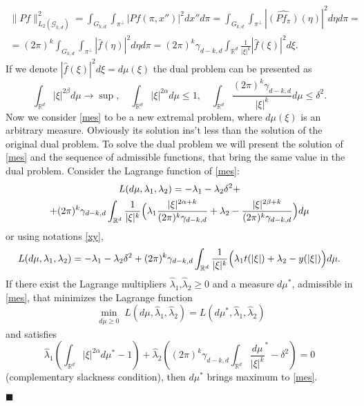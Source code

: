 \documentclass[12pt]{iopart}
\newenvironment{proof}
{\par\noindent{\bf Proof}}
{\hfill$\scriptstyle\blacksquare$}
\begin{document}
\begin{proof}
\[\]
\begin{multline*}
  \|Pf\|^2_{L_2(\mathcal G_{k,d})}=\int_{G_{k,d}}\int_{\pi^\perp}|Pf(\pi,x'')|^2  dx''d\pi =
  \int_{G_{k,d}}\int_{\pi^\perp}|\widehat{(Pf_\pi)}(\eta)|^2  d\eta d\pi = \\
  =(2\pi)^{k}\int_{G_{k,d}}\int_{\pi^\perp}|\widehat
  f(\eta )|^2d\eta d\pi =
  (2\pi)^{k}\gamma_{d-k,d}\int_{\mathbb R^d}\frac{1}{|\xi|^k}|\widehat f(\xi )|^2d\xi.
\end{multline*}
If we denote $|\widehat f(\xi)|^2 d\xi =d\mu(\xi)$ the dual problem can be presented as
  \begin{equation}
  \label{mes}
  \int_{\mathbb R^d}|\xi|^{2\beta}d\mu\to \sup,\quad
  \int_{\mathbb R^d}|\xi|^{2\alpha}d\mu\leqslant  1,\quad\int_{\mathbb R^d}\frac{(2\pi)^{k}\gamma_{d-k,d}}{|\xi|^k}d\mu\leqslant \delta^2.
  \end{equation}
Now we consider \eqref{mes} to be a new extremal problem, where $d\mu(\xi)$ is an arbitrary measure. Obviously its solution ins't less than the solution of the original dual problem. To solve the dual problem we will present the solution of \eqref{mes} and the sequence of admissible functions, that bring the same value in the dual problem.
Consider the Lagrange function of \eqref{mes}:
 \begin{multline*}
L(d\mu ,\lambda_1,\lambda_2)=-\lambda_1-\lambda_2\delta^2+\\
  +(2\pi)^{k}\gamma_{d-k,d}\int_{\mathbb R^d}\frac{1}{|\xi|^k}\Bigl(\lambda_1\frac{|\xi|^{2\alpha+k}}{(2\pi)^{k}\gamma_{d-k,d}}+\lambda_2-\frac{|\xi|^{2\beta+k}}{(2\pi)^{k}\gamma_{d-k,d}}\Bigr)d\mu
\end{multline*}
or using notations \eqref{xy},
 $$
L(d\mu ,\lambda_1,\lambda_2)=-\lambda_1-\lambda_2\delta^2+(2\pi)^{k}\gamma_{d-k,d}\int_{\mathbb R^d}\frac{1}{|\xi|^k}\Bigl(\lambda_1t(|\xi|)+\lambda_2-y(|\xi|)\Bigr)d\mu.
$$
If there exist the Lagrange multipliers $\widehat\lambda_1$,$\widehat\lambda_2\geqslant 0$ and a measure $d\mu^*$, admissible in \eqref{mes}, that minimizes the Lagrange function
	$$\min_{
    \begin{smallmatrix}
    d\mu\geqslant 0
    \end{smallmatrix}} L(d\mu,\widehat{\lambda}_1,\widehat{\lambda}_2)=L(d\mu^*,\widehat{\lambda}_1,\widehat{\lambda}_2)$$ 
and satisfies
    $$
    \widehat\lambda_1\left(\int_{\mathbb R^d}|\xi|^{2\alpha}d\mu^*-1\right)+\widehat\lambda_2\left((2\pi)^{k}\gamma_{d-k,d}\int_{\mathbb
    R^d}\frac{d\mu}{|\xi|^k}^*-\delta^2 \right)=0
    $$
 (complementary slackness condition), then $d\mu^*$ brings maximum to \eqref{mes}. 

\end{proof}
\end{document}
